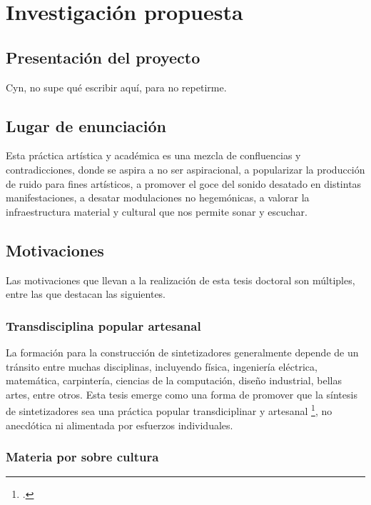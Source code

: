 \documentclass[../proyecto.tex]{subfiles}
\begin{document}
\chapter{Investigación propuesta}


\section{Presentación del proyecto}

Cyn, no supe qué escribir aquí, para no repetirme.

\section{Lugar de enunciación}

Esta práctica artística y académica es una mezcla de confluencias y contradicciones, donde se aspira a no ser aspiracional, a popularizar la producción de ruido para fines artísticos, a promover el goce del sonido desatado en distintas manifestaciones, a desatar modulaciones no hegemónicas, a valorar la infraestructura material y cultural que nos permite sonar y escuchar.

\section{Motivaciones}

Las motivaciones que llevan a la realización de esta tesis doctoral son múltiples, entre las que destacan las siguientes.

\subsection{Transdisciplina popular artesanal}

La formación para la construcción de sintetizadores generalmente depende de un tránsito entre muchas disciplinas, incluyendo física, ingeniería eléctrica, matemática, carpintería, ciencias de la computación, diseño industrial, bellas artes, entre otros. Esta tesis emerge como una forma de promover que la síntesis de sintetizadores sea una práctica popular transdiciplinar y artesanal \footcite{collins_handmade_2020}, no anecdótica ni alimentada por esfuerzos individuales.

\subsection{Materia por sobre cultura}
\end{document}
